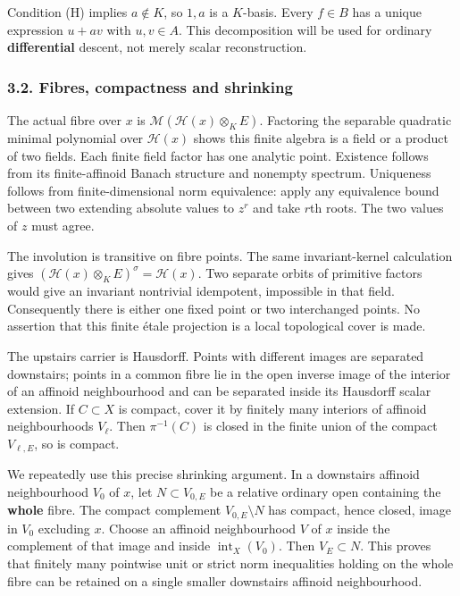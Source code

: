 \documentclass[
  11pt,
]{article}
\begin{document}
Condition (H) implies \(a\notin K\), so \(1,a\) is a \(K\)-basis. Every
\(f\in B\) has a unique expression \(u+av\) with \(u,v\in A\). This
decomposition will be used for ordinary \textbf{differential} descent,
not merely scalar reconstruction.

\subsubsection{3.2. Fibres, compactness and
shrinking}\label{fibres-compactness-and-shrinking}

The actual fibre over \(x\) is \(\mathcal M(\mathcal H(x)\otimes_K E)\).
Factoring the separable quadratic minimal polynomial over
\(\mathcal H(x)\) shows this finite algebra is a field or a product of
two fields. Each finite field factor has one analytic point. Existence
follows from its finite-affinoid Banach structure and nonempty spectrum.
Uniqueness follows from finite-dimensional norm equivalence: apply any
equivalence bound between two extending absolute values to \(z^r\) and
take \(r\)th roots. The two values of \(z\) must agree.

The involution is transitive on fibre points. The same invariant-kernel
calculation gives \((\mathcal H(x)\otimes_K E)^\sigma=\mathcal H(x)\).
Two separate orbits of primitive factors would give an invariant
nontrivial idempotent, impossible in that field. Consequently there is
either one fixed point or two interchanged points. No assertion that
this finite étale projection is a local topological cover is made.

The upstairs carrier is Hausdorff. Points with different images are
separated downstairs; points in a common fibre lie in the open inverse
image of the interior of an affinoid neighbourhood and can be separated
inside its Hausdorff scalar extension. If \(C\subset X\) is compact,
cover it by finitely many interiors of affinoid neighbourhoods
\(V_\ell\). Then \(\pi^{-1}(C)\) is closed in the finite union of the
compact \(V_{\ell,E}\), so is compact.

We repeatedly use this precise shrinking argument. In a downstairs
affinoid neighbourhood \(V_0\) of \(x\), let \(N\subset V_{0,E}\) be a
relative ordinary open containing the \textbf{whole} fibre. The compact
complement \(V_{0,E}\setminus N\) has compact, hence closed, image in
\(V_0\) excluding \(x\). Choose an affinoid neighbourhood \(V\) of \(x\)
inside the complement of that image and inside
\(\operatorname{int}_X(V_0)\). Then \(V_E\subset N\). This proves that
finitely many pointwise unit or strict norm inequalities holding on the
whole fibre can be retained on a single smaller downstairs affinoid
neighbourhood.
\end{document}
